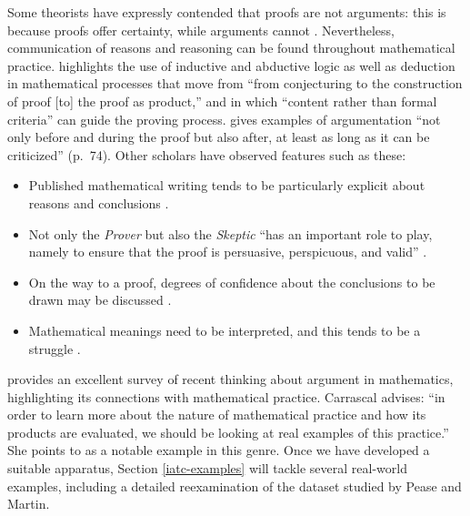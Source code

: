 \documentclass[smallextended,oneside]{svjour3}       %
\let\cite\citep
\newcommand\nothing[1]{#1}
\let\paragraph\nothing
\begin{document}
Some theorists have expressly contended that proofs are not arguments:
this is because proofs offer certainty, while arguments cannot
\cite{Dufour2013}.
Nevertheless, communication of reasons and reasoning
can be found throughout mathematical practice.
\citet{pedemonte2007} highlights the use of inductive and abductive logic
as well as deduction in mathematical processes that move from
``from conjecturing to the construction of proof [to] the proof as
product,'' and in which ``content rather than formal criteria''
can guide the proving process.  \citet{Dufour2013} gives examples
of argumentation ``not only before and during the proof but also after,
at least as long as it can be criticized'' (p.~74).
Other scholars have observed features such as these:
\begin{itemize}
\item Published mathematical writing tends to be particularly explicit about
reasons and conclusions \cite[p.~149]{dove2009towards}.
\item 
Not only the \emph{Prover} but also the \emph{Skeptic}
``has an important role to play, namely to ensure that the proof is persuasive, perspicuous, and valid'' \cite[p.~2618]{novaes2016reductio}.
\item On the way to a proof, degrees of
  confidence about the conclusions to be drawn may be discussed \cite[p.~17]{inglis2007modelling}.
\item Mathematical meanings need to be interpreted, and this tends to be a struggle  \cite[p.~360]{vanOers}.
\end{itemize}

\paragraph{\citet{Carrascal2015} provides an excellent survey of recent thinking about argument in mathematics, highlighting its connections with mathematical practice.}
Carrascal advises: ``in
order to learn more about the nature of mathematical practice and how
its products are evaluated, we should be looking at real examples of
this practice.''  She points to \citet{pease-and-martin} as a notable
example in this genre.  Once we have developed a suitable apparatus,
Section \ref{iatc-examples} will tackle several
real-world examples, including a detailed reexamination of the
dataset studied by Pease and Martin.
\end{document}
